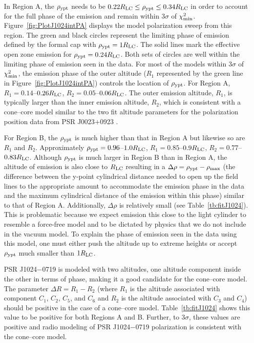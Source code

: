 In Region A, the $\rho_{\rm{ypt}}$ needs to be 
$ 0.22 R_{\rm{LC}} \leq \rho_{\rm{ypt}} \leq 0.34 R_{\rm{LC}}$ in order to account for the full 
phase of the emission and remain within $3\sigma$ of $\chi^2_{\rm{min}}$. 
Figure~\ref{fig:PlotJ1024intPA} displays the model polarization sweep from this region.
The green and black circles represent the limiting phase 
of emission defined by the formal cap with $\rho_{\rm{ypt}}=1R_{\rm{LC}}$.
The solid lines mark the effective open zone emission for $\rho_{\rm{ypt}}=0.24R_{\rm{LC}}$.
Both sets of circles are well within the limiting phase of emission seen in the data.
For most of the models within $3\sigma$ of $\chi^2_{\rm{min}}$, 
the emission phase of the outer altitude ($R_1$ represented 
by the green line in Figure~\ref{fig:PlotJ1024intPA}) 
controls the location of $\rho_{\rm{ypt}}$.
For Region A, $R_{1}=0.14$--$0.26R_{\rm{LC}}$, $R_{2}=0.05$--$0.06R_{\rm{LC}}$. 
The outer emission altitude, $R_{1}$, is typically larger than the inner emission altitude, $R_{2}$, which is
consistent with a cone--core model similar to the two fit altitude parameters for the polarization
position data from PSR J0023$+$0923 .

For Region B, the $\rho_{\rm{ypt}}$ is much higher than that in Region A but likewise so are $R_{1}$ and $R_{2}$.
Approximately $\rho_{\rm{ypt}}=0.96$--$1.0R_{\rm{LC}}$, 
$R_{1}=0.85$--$0.9R_{\rm{LC}}$, $R_{2}=0.77$--$0.83R_{\rm{LC}}$.
Although $\rho_{\rm{ypt}}$ is much larger in Region B than in Region A, the altitude of 
emission is also close to $R_{\rm{LC}}$ resulting in a $\Delta \rho=\rho_{\rm{ypt}}-\rho_{\rm{max}}$
(the
difference between the y-point cylindrical distance needed to open up the field lines
to the appropriate amount to accommodate the emission phase in the data and
the maximum cylindrical distance of the emission within this phase)
similar to that of
Region A.  Additionally, $\Delta \rho$
is relatively
small (see Table~\ref{tb:fitJ1024}).  This is problematic because we expect emission 
this close to the light cylinder to resemble a force-free model and to be dictated
by physics that we do not include in the vacuum model.
To explain the phase of emission seen in the data using this model, one must either push the 
altitude up to extreme heights or accept $\rho_{\rm{ypt}}$ much smaller than $1R_{\rm{LC}}$.

PSR J1024$-$0719 is modeled with two altitudes, one altitude component inside the other
in terms of phase, making it a good candidate for the cone--core model.  The parameter
$\Delta R=R_1-R_2$ (where $R_1$ is the altitude associated with component $C_1$, $C_2$, $C_5$, and $C_6$ and
$R_2$ is the altitude associated with $C_3$ and $C_4$) should be positive in the
case of a cone--core model.  Table~\ref{tb:fitJ1024} shows this value to be positive
for both Regions A and B.  
Further, to $3\sigma$, these values are positive and radio modeling of PSR J1024$-$0719 polarization
is consistent with the cone--core model.

